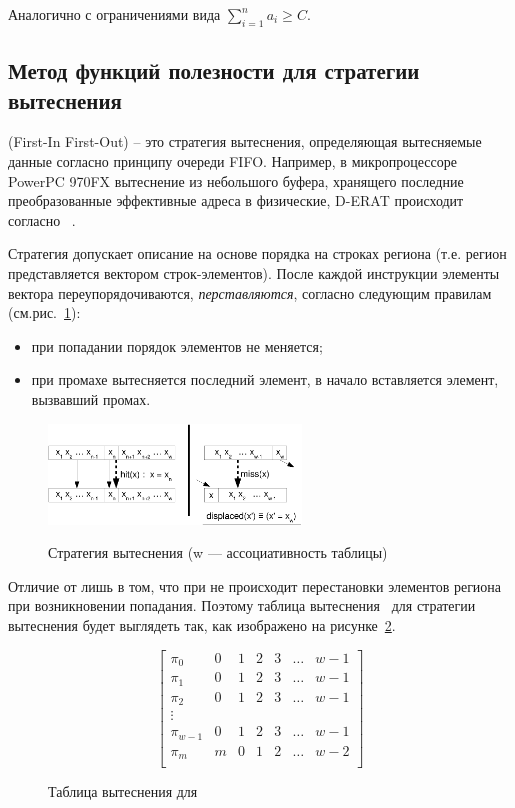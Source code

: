 Аналогично с ограничениями вида $\sum_{i=1}^n a_i \geqslant C$.


\subsection{Метод функций полезности для стратегии
вытеснения \FIFO}

\FIFO (First-In First-Out) -- это стратегия вытеснения, определяющая
вытесняемые данные согласно принципу очереди FIFO. Например, в
микропроцессоре PowerPC 970FX вытеснение из небольшого буфера,
хранящего последние преобразованные эффективные адреса в физические,
D-ERAT происходит согласно \FIFO~\cite{PowerPC970FXUserManual}.

Стратегия \FIFO допускает описание на основе порядка на строках
региона (т.е. регион представляется вектором строк-элементов). После каждой
инструкции элементы вектора переупорядочиваются, \emph{перставляются}, согласно следующим правилам
(см.рис.~\ref{fifo1}):
\begin{itemize}
\item при попадании порядок элементов не меняется;
\item при промахе вытесняется последний элемент, в начало вставляется элемент,
вызвавший промах.
\end{itemize}

\begin{figure}[h] \center
  \includegraphics[width=0.6\textwidth]{2.theor/fifo1}\\
  \caption{Стратегия вытеснения \FIFO (w --- ассоциативность
таблицы)}\label{fifo1}
\end{figure}

Отличие от \LRU лишь в том, что при \FIFO не происходит перестановки
элементов региона при возникновении попадания. Поэтому таблица
вытеснения~\cite{policy_tables} для стратегии вытеснения \FIFO будет
выглядеть так, как изображено на рисунке~\ref{fifo_policy_table}.

\begin{figure}
$$
  \left[
    \begin{array}{c|cccccc}
      \pi_0 & 0 & 1 & 2 & 3 & \dots & w-1 \\
      \pi_1 & 0 & 1 & 2 & 3 & \dots & w-1 \\
      \pi_2 & 0 & 1 & 2 & 3 & \dots & w-1 \\
      \vdots &  &  &  & & & \\
      \pi_{w-1} & 0 & 1 & 2 & 3 & \dots & w-1 \\
      \pi_m & m & 0 & 1 & 2 & \dots & w-2 \\
    \end{array}
  \right]
$$
\caption{Таблица вытеснения для \FIFO}\label{fifo_policy_table}
\end{figure}

